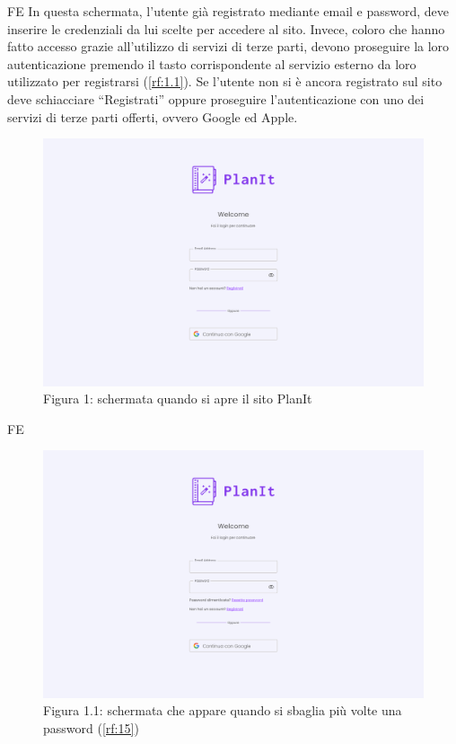\begin{listaPersonale}{FE}
     In questa schermata, l’utente già registrato mediante email e password, deve inserire le credenziali da lui scelte per accedere al sito. Invece, coloro che hanno fatto accesso grazie all’utilizzo di servizi di terze parti, devono proseguire la loro autenticazione premendo il tasto corrispondente al servizio esterno da loro utilizzato per registrarsi (\ref{rf:1.1}).
    Se l’utente non si è ancora registrato sul sito deve schiacciare “Registrati” oppure proseguire l’autenticazione con uno dei servizi di terze parti offerti, ovvero Google ed Apple.
    \begin{figure}[H]
        \centering
        \includegraphics[width=1\textwidth]{img/FrontEnd/Login.png}
        \caption{Figura 1: schermata quando si apre il sito PlanIt}
    \end{figure}
    \begin{listaPersonale2}{FE}
        \begin{figure}[H]
            \centering
            \includegraphics[width=1\textwidth]{img/FrontEnd/ResettaPssw.png}
            \caption{Figura 1.1: schermata che appare quando si sbaglia più volte una password (\ref{rf:15})}
        \end{figure}
    \end{listaPersonale2}


\end{listaPersonale}
